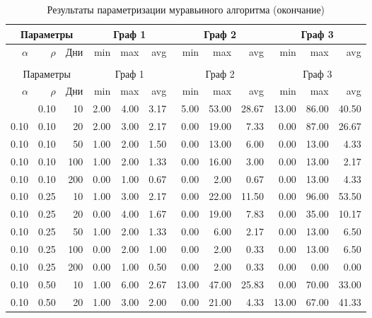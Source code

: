 \documentclass{bmstu}
\begin{document}
\begin{longtable}{|r|r|r|r|r|r|r|r|r|r|r|r|}
\caption{Результаты параметризации муравьиного алгоритма (начало)}\label{tbl:param}
\\ \hline
\multicolumn{3}{|c|}{Параметры} & \multicolumn{3}{|c|}{Граф 1} & \multicolumn{3}{|c|}{Граф 2} & \multicolumn{3}{|c|}{Граф 3} \\
\hline
$\alpha$ & $\rho$ & Дни & min & max & avg & min & max & avg & min & max & avg \\
\hline
\endfirsthead
\caption{Результаты параметризации муравьиного алгоритма (продолжение)}
\\ \hline
\multicolumn{3}{|c|}{Параметры} & \multicolumn{3}{|c|}{Граф 1} & \multicolumn{3}{|c|}{Граф 2} & \multicolumn{3}{|c|}{Граф 3} \\
\hline
$\alpha$ & $\rho$ & Дни & min & max & avg & min & max & avg & min & max & avg \\
\hline
\endhead
\hline
\endfoot
\caption{Результаты параметризации муравьиного алгоритма (окончание)}
\endlastfoot
\hline
0.10 & 0.10 & 10 & 2.00 & 4.00 & 3.17 & 5.00 & 53.00 & 28.67 & 13.00 & 86.00 & 40.50  \\
0.10 & 0.10 & 20 & 2.00 & 3.00 & 2.17 & 0.00 & 19.00 & 7.33 & 0.00 & 87.00 & 26.67  \\
0.10 & 0.10 & 50 & 1.00 & 2.00 & 1.50 & 0.00 & 13.00 & 6.00 & 0.00 & 13.00 & 4.33  \\
0.10 & 0.10 & 100 & 1.00 & 2.00 & 1.33 & 0.00 & 16.00 & 3.00 & 0.00 & 13.00 & 2.17  \\
0.10 & 0.10 & 200 & 0.00 & 1.00 & 0.67 & 0.00 & 2.00 & 0.67 & 0.00 & 13.00 & 4.33  \\
\hline
0.10 & 0.25 & 10 & 1.00 & 3.00 & 2.17 & 0.00 & 22.00 & 11.50 & 0.00 & 96.00 & 53.50  \\
0.10 & 0.25 & 20 & 0.00 & 4.00 & 1.67 & 0.00 & 19.00 & 7.83 & 0.00 & 35.00 & 10.17  \\
0.10 & 0.25 & 50 & 1.00 & 2.00 & 1.33 & 0.00 & 6.00 & 2.17 & 0.00 & 13.00 & 6.50  \\
0.10 & 0.25 & 100 & 0.00 & 2.00 & 1.00 & 0.00 & 2.00 & 0.33 & 0.00 & 13.00 & 6.50  \\
0.10 & 0.25 & 200 & 0.00 & 1.00 & 0.50 & 0.00 & 2.00 & 0.33 & 0.00 & 0.00 & 0.00  \\
\hline
0.10 & 0.50 & 10 & 1.00 & 6.00 & 2.67 & 13.00 & 47.00 & 25.83 & 0.00 & 70.00 & 33.00  \\
0.10 & 0.50 & 20 & 1.00 & 3.00 & 2.00 & 0.00 & 21.00 & 4.33 & 13.00 & 67.00 & 41.33  \\

\end{longtable}
\end{document}

